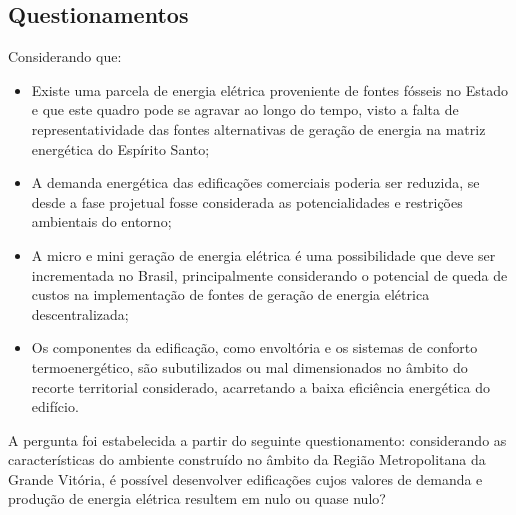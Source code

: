 \subsection{Questionamentos}
\begin{onehalfspace}
        Considerando que:
    \begin{itemize}
        \item Existe uma parcela de energia elétrica proveniente de fontes fósseis no 
        Estado e que este quadro pode se agravar ao longo do tempo, visto a falta de 
        representatividade das fontes alternativas de geração de energia na matriz 
        energética do Espírito Santo;
        \item A demanda energética das edificações comerciais poderia  ser reduzida,  se 
        desde a fase projetual fosse considerada as potencialidades e restrições 
        ambientais do entorno;
        \item A micro e mini geração de energia elétrica é uma possibilidade que deve ser 
        incrementada no Brasil, principalmente considerando o potencial de queda de custos 
        na implementação de fontes de geração de energia elétrica descentralizada;
        \item Os   componentes   da   edificação,   como   envoltória   e   os   sistemas   
        de   conforto termoenergético, são subutilizados ou mal dimensionados no âmbito do 
        recorte territorial considerado, acarretando a baixa eficiência energética do 
        edifício.
    \end{itemize}
    A pergunta foi estabelecida a partir do seguinte questionamento: 
    considerando as características do  ambiente  construído  no  âmbito  da  Região  
    Metropolitana  da  Grande  Vitória,  é  possível desenvolver edificações cujos valores 
    de demanda e produção de energia elétrica resultem em nulo ou quase nulo?
\end{onehalfspace}